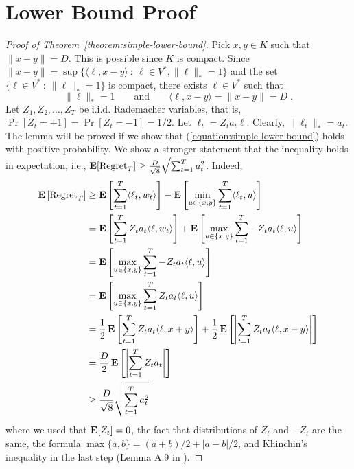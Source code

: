 \section{Lower Bound Proof}
\label{section:lower-bound-proof}

\begin{proof}[Proof of Theorem~\ref{theorem:simple-lower-bound}]
Pick $x,y \in K$ such that $\|x - y\| = D$. This is possible since $K$ is compact.
Since $\|x - y\| = \sup \{\langle \ell, x - y \rangle ~:~ \ell \in V^*, \|\ell\|_* = 1\}$
and the set $\{ \ell \in V^* ~:~ \|\ell\|_* = 1 \}$ is compact, there exists $\ell \in V^*$
such that
$$
\|\ell\|_* = 1 \qquad \text{and} \qquad \langle \ell, x - y \rangle = \|x - y\| = D \; .
$$
Let $Z_1, Z_2, \dots, Z_T$ be i.i.d. Rademacher variables, that is,
$\Pr[Z_t = +1] = \Pr[Z_t = -1] = 1/2$. Let $\ell_t = Z_t a_t \ell$.
Clearly, $\|\ell_t\|_* = a_t$. The lemma will be proved if we show that
(\ref{equation:simple-lower-bound}) holds with positive probability.
We show a stronger statement that the inequality holds in expectation, i.e.,
$\operatorname*{\mathbf{E}}[\operatorname{Regret}_T] \ge \frac{D}{\sqrt{8}} \sqrt{\sum_{t=1}^T a_t^2}$. Indeed,
\begin{align*}
\operatorname*{\mathbf{E}}\left[ \operatorname{Regret}_T \right]
& \ge \operatorname*{\mathbf{E}}\left[ \sum_{t=1}^T \langle \ell_t, w_t \rangle \right] - \operatorname*{\mathbf{E}}\left[\min_{u \in \{x,y\}} \sum_{t=1}^T \langle \ell_t, u \rangle \right] \\
& = \operatorname*{\mathbf{E}}\left[ \sum_{t=1}^T Z_t a_t \langle \ell, w_t \rangle \right] + \operatorname*{\mathbf{E}} \left[\max_{u \in \{x,y\}} \sum_{t=1}^T -Z_t a_t \langle \ell, u \rangle \right]  \\
& = \operatorname*{\mathbf{E}}\left[ \max_{u \in \{x,y\}} \sum_{t=1}^T -Z_t a_t \langle \ell, u \rangle \right] \\
& = \operatorname*{\mathbf{E}}\left[ \max_{u \in \{x,y\}} \sum_{t=1}^T Z_t a_t \langle \ell, u \rangle \right]  \\
& = \frac{1}{2} \operatorname*{\mathbf{E}}\left[ \sum_{t=1}^T Z_t a_t \langle \ell, x + y \rangle \right]  + \frac{1}{2}\operatorname*{\mathbf{E}}\left[ \left|\sum_{t=1}^T Z_t a_t \langle \ell, x - y \rangle \right| \right] \\
& = \frac{D}{2}\operatorname*{\mathbf{E}}\left[ \left|\sum_{t=1}^T Z_t a_t \right| \right] \\
& \ge \frac{D}{\sqrt{8}} \sqrt{\sum_{t=1}^T a_t^2}
\end{align*}
where we used that $\operatorname*{\mathbf{E}}[Z_t] = 0$, the fact that distributions of $Z_t$ and
$-Z_t$ are the same, the formula $\max\{a,b\} = (a+b)/2 + |a-b|/2$, and
Khinchin's inequality in the last step (Lemma A.9 in
\cite{Cesa-Bianchi-Lugosi-2006}).
\end{proof}
